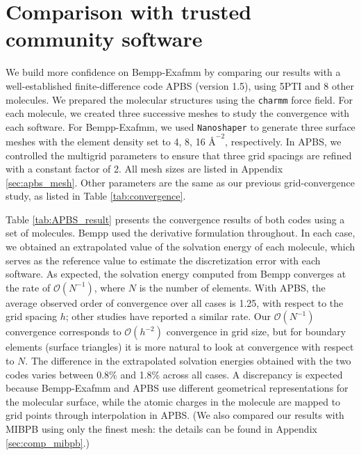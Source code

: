 \small{

\section{Comparison with trusted community software} \label{comparison}
We build more confidence on Bempp-Exafmm by comparing our results with a well-established finite-difference code APBS (version 1.5), using 5PTI and 8 other molecules.
We prepared the molecular structures using the \texttt{charmm} force field.
For each molecule, we created three successive meshes to study the convergence with each software.
For Bempp-Exafmm, we used \texttt{Nanoshaper} to generate three surface meshes with the element density set to 4, 8, 16 ${\si{\angstrom}}^{-2}$, respectively.
In APBS, we controlled the multigrid parameters to ensure that three grid spacings are refined with a constant factor of 2.
All mesh sizes are listed in Appendix \ref{sec:apbs_mesh}.
Other parameters are the same as our previous grid-convergence study, as listed in Table \ref{tab:convergence}.

Table \ref{tab:APBS_result} presents the convergence results of both codes using a set of molecules.
Bempp used the derivative formulation throughout.
In each case, we obtained an extrapolated value of the solvation energy of each molecule, which serves as the reference value to estimate the discretization error with each software.
As expected, the solvation energy computed from Bempp converges at the rate of $\mathcal{O}(N^{-1})$, where $N$ is the number of elements.
With APBS, the average observed order of convergence over all cases is 1.25, with respect to the grid spacing $h$; other studies \cite{CooperBardhanBarba2014,GengKrasny2013} have reported a similar rate. 
Our $\mathcal{O}(N^{-1})$ convergence corresponds to $\mathcal{O}(h^{-2})$ convergence in grid size, but for boundary elements (surface triangles) it is more natural to look at convergence with respect to $N$.
The difference in the extrapolated solvation energies obtained with the two codes varies between 0.8\% and 1.8\% across all cases.
A discrepancy is expected because Bempp-Exafmm and APBS use different geometrical representations for the molecular surface, while the atomic charges in the molecule are mapped to grid points through interpolation in APBS.
(We also compared our results with MIBPB \cite{chen2011mibpb} using only the finest mesh: the details can be found in Appendix \ref{sec:comp_mibpb}.)

}
